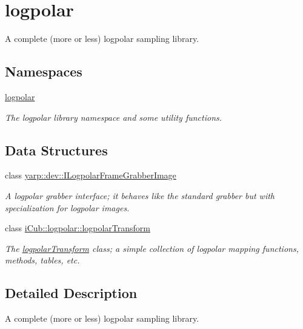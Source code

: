 \section{logpolar}
\label{group__logpolarLibrary}


A complete (more or less) logpolar sampling library.  


\subsection*{Namespaces}
\begin{DoxyCompactItemize}
\item 
 \hyperlink{namespacelogpolar}{logpolar}
\begin{DoxyCompactList}\small\item\em The logpolar library namespace and some utility functions. \end{DoxyCompactList}\end{DoxyCompactItemize}
\subsection*{Data Structures}
\begin{DoxyCompactItemize}
\item 
class \hyperlink{classyarp_1_1dev_1_1ILogpolarFrameGrabberImage}{yarp\+::dev\+::\+I\+Logpolar\+Frame\+Grabber\+Image}
\begin{DoxyCompactList}\small\item\em A logpolar grabber interface; it behaves like the standard grabber but with specialization for logpolar images. \end{DoxyCompactList}\item 
class \hyperlink{classiCub_1_1logpolar_1_1logpolarTransform}{i\+Cub\+::logpolar\+::logpolar\+Transform}
\begin{DoxyCompactList}\small\item\em The \hyperlink{classiCub_1_1logpolar_1_1logpolarTransform}{logpolar\+Transform} class; a simple collection of logpolar mapping functions, methods, tables, etc. \end{DoxyCompactList}\end{DoxyCompactItemize}


\subsection{Detailed Description}
A complete (more or less) logpolar sampling library. 

